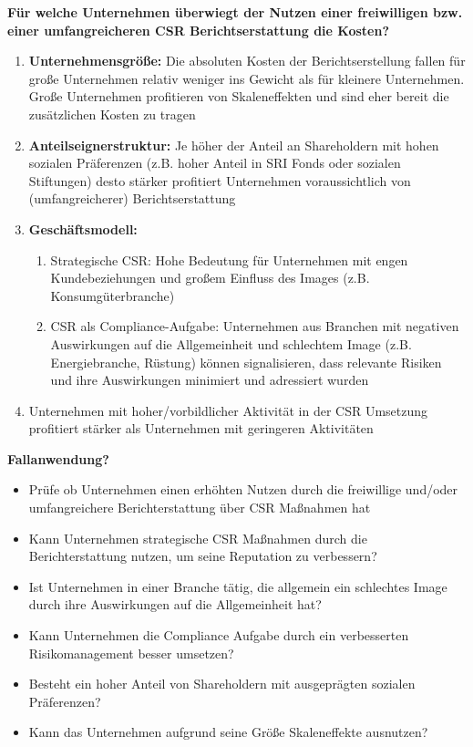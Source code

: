 \documentclass[
]{article}
\providecommand{\tightlist}{%
  \setlength{\itemsep}{0pt}\setlength{\parskip}{0pt}}
\begin{document}
\textbf{Für welche Unternehmen überwiegt der Nutzen einer freiwilligen
bzw. einer umfangreicheren CSR Berichtserstattung die Kosten?}

\begin{enumerate}
\def\labelenumi{\arabic{enumi}.}
\item
  \textbf{Unternehmensgröße: }Die absoluten Kosten der
  Berichtserstellung fallen für große Unternehmen relativ weniger ins
  Gewicht als für kleinere Unternehmen. Große Unternehmen profitieren
  von Skaleneffekten und sind eher bereit die zusätzlichen Kosten zu
  tragen
\item
  \textbf{Anteilseignerstruktur:} Je höher der Anteil an Shareholdern
  mit hohen sozialen Präferenzen (z.B. hoher Anteil in SRI Fonds oder
  sozialen Stiftungen) desto stärker profitiert Unternehmen
  voraussichtlich von (umfangreicherer) Berichtserstattung
\item
  \textbf{Geschäftsmodell:}

  \begin{enumerate}
  \def\labelenumii{\alph{enumii}.}
  \tightlist
  \item
    Strategische CSR: Hohe Bedeutung für Unternehmen mit engen
    Kundebeziehungen und großem Einfluss des Images (z.B.
    Konsumgüterbranche)
  \item
    CSR als Compliance-Aufgabe: Unternehmen aus Branchen mit negativen
    Auswirkungen auf die Allgemeinheit und schlechtem Image (z.B.
    Energiebranche, Rüstung) können signalisieren, dass relevante
    Risiken und ihre Auswirkungen minimiert und adressiert wurden
  \end{enumerate}
\item
  Unternehmen mit hoher/vorbildlicher Aktivität in der CSR Umsetzung
  profitiert stärker als Unternehmen mit geringeren Aktivitäten
\end{enumerate}

\textbf{Fallanwendung?}

\begin{itemize}
\tightlist
\item
  Prüfe ob Unternehmen einen erhöhten Nutzen durch die freiwillige
  und/oder umfangreichere Berichterstattung über CSR Maßnahmen hat
\item
  Kann Unternehmen strategische CSR Maßnahmen durch die
  Berichterstattung nutzen, um seine Reputation zu verbessern?
\item
  Ist Unternehmen in einer Branche tätig, die allgemein ein schlechtes
  Image durch ihre Auswirkungen auf die Allgemeinheit hat?
\item
  Kann Unternehmen die Compliance Aufgabe durch ein verbesserten
  Risikomanagement besser umsetzen?
\item
  Besteht ein hoher Anteil von Shareholdern mit ausgeprägten sozialen
  Präferenzen?
\item
  Kann das Unternehmen aufgrund seine Größe Skaleneffekte ausnutzen?
\end{itemize}
\end{document}
